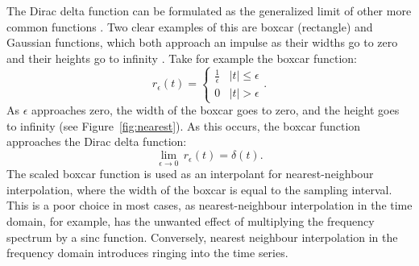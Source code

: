 The Dirac delta function can be formulated as the generalized limit of other more common functions \cite{papoulis62}.
Two clear examples of this are boxcar (rectangle) and Gaussian functions, which both approach an impulse as their widths go to zero and their heights go to infinity \cite{papoulis62}.
Take for example the boxcar function:
\begin{equation}
	\label{eq:boxcar}
	r_{\epsilon} \left( t \right) = \left\{ \begin{array}{cc} \frac{1}{\epsilon} & |t| \leq \epsilon  \\
 0 & |t| > \epsilon 
	\end{array}
	\right..
\end{equation} 
As $\epsilon$ approaches zero, the width of the boxcar goes to zero, and the height goes to infinity (see Figure~\ref{fig:nearest}).
As this occurs, the boxcar function approaches the Dirac delta function:
\begin{equation}
	\label{eq:delta_boxcar}
	\lim_{\epsilon \to 0} \, r_{\epsilon} \left( t \right) = \delta \left( t \right).
\end{equation} 
The scaled boxcar function is used as an interpolant for nearest-neighbour interpolation, where the width of the boxcar is equal to the sampling interval.
This is a poor choice in most cases, as nearest-neighbour interpolation in the time domain, for example, has the unwanted effect of multiplying the frequency spectrum by a sinc function.
Conversely, nearest neighbour interpolation in the frequency domain introduces ringing into the time series.   

